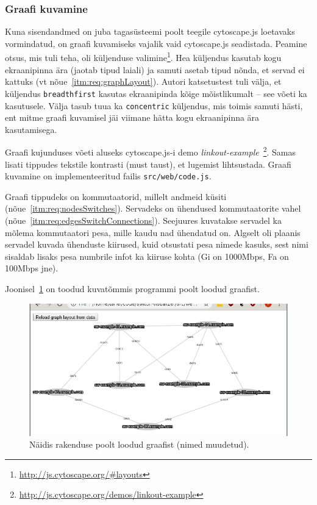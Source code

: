 \documentclass[12pt]{article}
\begin{document}
\subsubsection{Graafi kuvamine} \label{graphDisplay}
Kuna sisendandmed on juba tagasüsteemi poolt teegile cytoscape.js loetavaks vormindatud, on
graafi kuvamiseks vajalik vaid cytoscape.js seadistada.
Peamine otsus, mis tuli teha, oli küljenduse
valimine\footnote{\url{http://js.cytoscape.org/\#layouts}}.
Hea küljendus kasutab kogu ekraanipinna ära (jaotab tipud laiali) ja samuti asetab tipud nõnda, et
servad ei kattuks (vt nõue~\ref{itm:req:graphLayout}).
Autori katsetustest tuli välja, et küljendus \texttt{breadthfirst} kasutas ekraanipinda kõige
mõistlikumalt -- see võeti ka kasutusele.
Välja tasub tuua ka \texttt{concentric} küljendus, mis toimis samuti hästi, ent mitme graafi
kuvamisel jäi viimane hätta kogu ekraanipinna ära kasutamisega.

Graafi kujunduses võeti aluseks cytoscape.js-i demo
\textit{linkout-example}~\footnote{\url{http://js.cytoscape.org/demos/linkout-example}}.
Samas lisati tippudes tekstile kontrasti (must taust), et lugemist lihtsustada.
Graafi kuvamine on implementeeritud failis \texttt{src/web/code.js}.

Graafi tippudeks on kommutaatorid, millelt andmeid küsiti (nõue~\ref{itm:req:nodesSwitches}).
Servadeks on ühendused kommutaatorite vahel (nõue~\ref{itm:req:edgesSwitchConnections}).
Seejuures kuvatakse servadel ka mõlema kommutaatori pesa, mille kaudu nad ühendatud on.
Algselt oli plaanis servadel kuvada ühenduste kiirused, kuid otsustati pesa nimede kasuks, sest
nimi sisaldab lisaks pesa numbrile infot ka kiiruse kohta (Gi on 1000Mbps, Fa on 100Mbps jne).

Joonisel~\ref{fig:graph} on toodud kuvatõmmis programmi poolt loodud graafist.

\begin{figure} [ht] %
\begin{center}
\includegraphics[width=1\textwidth]{graph}
    \caption{Näidis rakenduse poolt loodud graafist (nimed muudetud).}
\label{fig:graph}
\end{center}
\end{figure}
\end{document}
